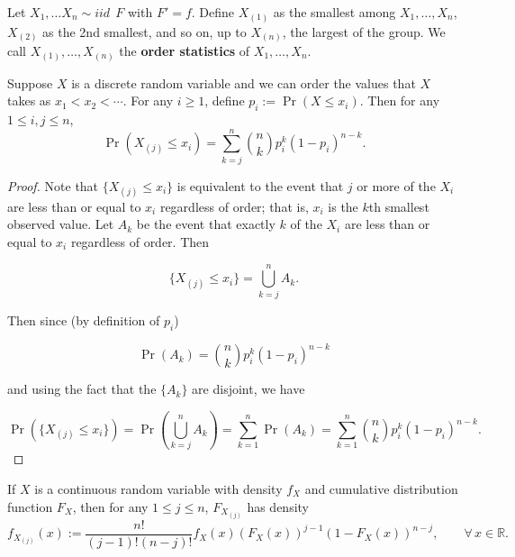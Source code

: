 \begin{definition} Let \(X_1, \ldots X_n \sim iid \ \ F\) with \(F' = f\). Define \(X_{(1)}\) as the smallest among \(X_1, \ldots, X_n\), \(X_{(2)}\) as the 2nd smallest, and so on, up to \(X_{(n)}\), the largest of the group. We call \(X_{(1)}, \ldots, X_{(n)}\) the \textbf{order statistics} of \(X_1, \ldots, X_n\).

\end{definition}

\begin{proposition}\label{mathstats.order.stats.dist} Suppose $X$ is a discrete random variable and we can order the values that $X$ takes as $x_{1}<x_{2}<\cdots$.  For any $i\geq1$, define $p_{i}:= \Pr(X\leq x_{i})$. Then for any $1\leq i,j\leq n$,
$$\Pr(X_{(j)}\leq x_{i})=\sum_{k=j}^{n}\binom{n}{k}p_{i}^{k}(1-p_{i})^{n-k}.$$
\end{proposition}

\begin{proof} Note that \(\{X_{(j)} \leq x_i\}\) is equivalent to the event that \(j\) or more of the \(X_i\) are less than or equal to \(x_i\) regardless of order; that is, \(x_i\) is the \(k\)th smallest observed value. Let \(A_k\) be the event that exactly \(k\) of the \(X_i\) are less than or equal to \(x_i\) regardless of order. Then

\[
\{X_{(j)} \leq x_i\} = \bigcup_{k=j}^n A_k.
\]

Then since (by definition of \(p_i\))

\[
\Pr(A_k) = \binom{n}{k} p_i^k(1-p_i)^{n-k}
\]

and using the fact that the \(\{A_k\}\) are disjoint, we have

\[
\Pr(\{X_{(j)} \leq x_i\}) = \Pr(\bigcup_{k=j}^n A_k) = \sum_{k=1}^n \Pr(A_k) = \sum_{k=1}^n \binom{n}{k} p_i^k(1-p_i)^{n-k}.
\]

\end{proof}

\begin{corollary}\label{mathstats.order.stats.density.541a} If $X$ is a continuous random variable with density $f_{X}$ and cumulative distribution function $F_{X}$, then for any $1\leq j\leq n$, $F_{X_{(j)}}$ has density
$$f_{X_{(j)}}(x):=\frac{n!}{(j-1)!(n-j)!}f_{X}(x)(F_{X}(x))^{j-1}(1-F_{X}(x))^{n-j},\qquad\forall\,x\in\mathbb{R}.$$

\end{corollary}

